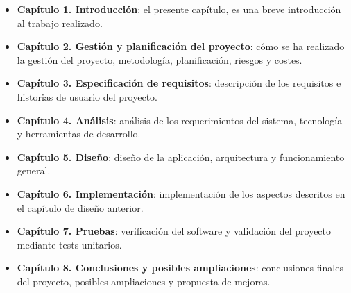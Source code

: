 \begin{itemize}
    \item \textbf{Capítulo 1. Introducción}: el presente capítulo, es una breve introducción al trabajo realizado. 
    \item \textbf{Capítulo 2. Gestión y planificación del proyecto}: cómo se ha realizado la gestión del proyecto, metodología, planificación, riesgos y costes.
    \item \textbf{Capítulo 3. Especificación de requisitos}: descripción de los requisitos e historias de usuario del proyecto.
    \item \textbf{Capítulo 4. Análisis}: análisis de los requerimientos del sistema, tecnología y herramientas de desarrollo.
    \item \textbf{Capítulo 5. Diseño}: diseño de la aplicación, arquitectura y funcionamiento general.
    \item \textbf{Capítulo 6. Implementación}: implementación de los aspectos descritos en el capítulo de diseño anterior.
    \item \textbf{Capítulo 7. Pruebas}: verificación del software y validación del proyecto mediante tests unitarios.
    \item \textbf{Capítulo 8. Conclusiones y posibles ampliaciones}: conclusiones finales del proyecto, posibles ampliaciones y propuesta de mejoras.
\end{itemize}